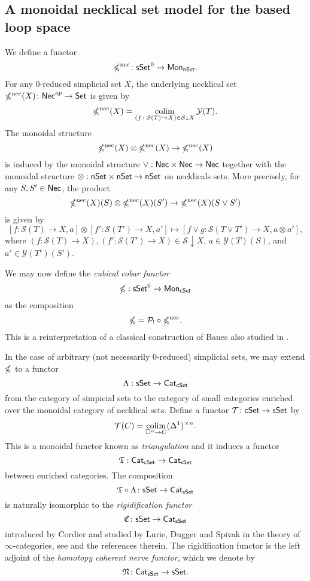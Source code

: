 \subsection{A monoidal necklical set model for the based loop space}
We define a functor 
$$\mathbb{\Omega}^{\text{nec}} \colon \mathsf{sSet}^0 \to \mathsf{Mon}_{\mathsf{nSet}}.$$
For any $0$-reduced simplicial set $X$, the underlying necklical set $\mathbb{\Omega}^{\text{nec}}(X) \colon \mathsf{Nec}^{op} \to \mathsf{Set}$ is given by
$$\mathbb{\Omega}^{\text{nec}}(X) = \operatorname*{colim}_{(f \colon \mathcal{S}(T) \to X) \in  \mathcal{S} \downarrow X} \mathcal{Y}(T).$$
The monoidal structure $$\mathbb{\Omega}^{\text{nec}}(X) \otimes \mathbb{\Omega}^{\text{nec}}(X) \to \mathbb{\Omega}^{\text{nec}}(X)$$
is induced by the monoidal structure $\vee: \mathsf{Nec} \times \mathsf{Nec} \to \mathsf{Nec}$ together with the monoidal structure $\otimes: \mathsf{nSet} \times \mathsf{nSet} \to \mathsf{nSet}$ on necklicals sets. More precisely, for any $S, S' \in \mathsf{Nec}$, the product $$\mathbb{\Omega}^{\text{nec}}(X)(S) \otimes \mathbb{\Omega}^{\text{nec}}(X)(S') \to \mathbb{\Omega}^{\text{nec}}(X)(S \vee S')$$ is given by $$[f\colon \mathcal{S}(T) \to X, a] \otimes [f'\colon \mathcal{S}(T') \to X, a'] \mapsto [f \vee g\colon \mathcal{S}(T\vee T') \to X, a \otimes  a'],$$
where $(f\colon \mathcal{S}(T) \to X), (f'\colon \mathcal{S}(T') \to X) \in \mathcal{S} \downarrow X$, $a\in \mathcal{Y}(T)(S)$, and $a'\in \mathcal{Y}(T')(S')$.

We may now define the \textit{cubical cobar functor} $$\mathbb{\Omega}: \mathsf{sSet}^0 \to \mathsf{Mon}_{\mathsf{cSet}}$$ as the composition $$\mathbb{\Omega}= \mathcal{P}_! \circ \mathbb{\Omega}^{\text{nec}}.$$ This is a reinterpretation of a classical construction of Baues \cite{Baues} also studied in \cite{rivera-zeinalian-cubical}. 


\begin{remark}

In the case of arbitrary (not necessarily $0$-reduced) simplicial sets, we may extend  $\mathbb{\Omega}$ to a functor
$$\Lambda: \mathsf{sSet} \to \mathsf{Cat}_{\mathsf{cSet}}$$ from the category of simpicial sets to the category of small categories enriched over the monoidal category of necklical sets. Define a functor $\mathcal{T} \colon \mathsf{cSet} \to \mathsf{sSet}$ by $$\mathcal{T}(C) = \operatorname*{colim}_{\square^n \to C} (\Delta^1)^{\times n}.$$ This is a monoidal functor known as \textit{triangulation} and it induces a functor $$\mathfrak{T}: \mathsf{Cat}_{\mathsf{cSet}} \to \mathsf{Cat}_{\mathsf{sSet}}$$ between enriched categories. The composition 
$$\mathfrak{T} \circ \Lambda \colon \mathsf{sSet} \to \mathsf{Cat}_{\mathsf{sSet}}$$ is naturally isomorphic to the \textit{rigidification functor}
$$\mathfrak{C} \colon \mathsf{sSet} \to \mathsf{Cat}_{\mathsf{sSet}}$$
introduced by Cordier and studied by Lurie, Dugger and Spivak in the theory of $\infty$-categories, see \cite{rivera-zeinalian-cubical} and the references therein. The rigidification functor is the left adjoint of the \textit{homotopy coherent nerve functor}, which we denote by
$$\mathfrak{N} \colon \mathsf{Cat}_{\mathsf{sSet}} \to \mathsf{sSet}.$$
\end{remark}

